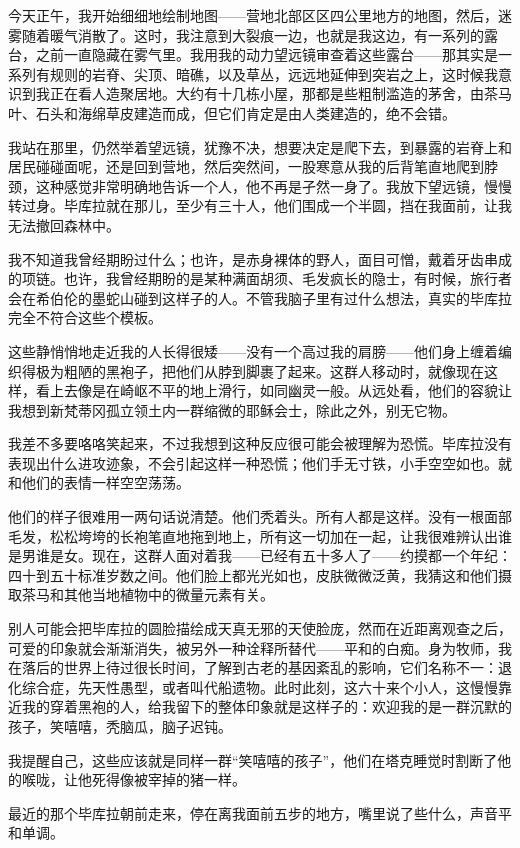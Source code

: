 \documentclass[AutoFakeBold=true]{book}
\begin{document}
今天正午，我开始细细地绘制地图——营地北部区区四公里地方的地图，然后，迷雾随着暖气消散了。这时，我注意到大裂痕一边，也就是我这边，有一系列的露台，之前一直隐藏在雾气里。我用我的动力望远镜审查着这些露台——那其实是一系列有规则的岩脊、尖顶、暗礁，以及草丛，远远地延伸到突岩之上，这时候我意识到我正在看人造聚居地。大约有十几栋小屋，那都是些粗制滥造的茅舍，由茶马叶、石头和海绵草皮建造而成，但它们肯定是由人类建造的，绝不会错。

我站在那里，仍然举着望远镜，犹豫不决，想要决定是爬下去，到暴露的岩脊上和居民碰碰面呢，还是回到营地，然后突然间，一股寒意从我的后背笔直地爬到脖颈，这种感觉非常明确地告诉一个人，他不再是孑然一身了。我放下望远镜，慢慢转过身。毕库拉就在那儿，至少有三十人，他们围成一个半圆，挡在我面前，让我无法撤回森林中。

我不知道我曾经期盼过什么；也许，是赤身裸体的野人，面目可憎，戴着牙齿串成的项链。也许，我曾经期盼的是某种满面胡须、毛发疯长的隐士，有时候，旅行者会在希伯伦的墨蛇山碰到这样子的人。不管我脑子里有过什么想法，真实的毕库拉完全不符合这些个模板。

这些静悄悄地走近我的人长得很矮——没有一个高过我的肩膀——他们身上缠着编织得极为粗陋的黑袍子，把他们从脖到脚裹了起来。这群人移动时，就像现在这样，看上去像是在崎岖不平的地上滑行，如同幽灵一般。从远处看，他们的容貌让我想到新梵蒂冈孤立领土内一群缩微的耶稣会士，除此之外，别无它物。

我差不多要咯咯笑起来，不过我想到这种反应很可能会被理解为恐慌。毕库拉没有表现出什么进攻迹象，不会引起这样一种恐慌；他们手无寸铁，小手空空如也。就和他们的表情一样空空荡荡。

他们的样子很难用一两句话说清楚。他们秃着头。所有人都是这样。没有一根面部毛发，松松垮垮的长袍笔直地拖到地上，所有这一切加在一起，让我很难辨认出谁是男谁是女。现在，这群人面对着我——已经有五十多人了——约摸都一个年纪：四十到五十标准岁数之间。他们脸上都光光如也，皮肤微微泛黄，我猜这和他们摄取茶马和其他当地植物中的微量元素有关。

别人可能会把毕库拉的圆脸描绘成天真无邪的天使脸庞，然而在近距离观查之后，可爱的印象就会渐渐消失，被另外一种诠释所替代——平和的白痴。身为牧师，我在落后的世界上待过很长时间，了解到古老的基因紊乱的影响，它们名称不一：退化综合症，先天性愚型，或者叫代船遗物。此时此刻，这六十来个小人，这慢慢靠近我的穿着黑袍的人，给我留下的整体印象就是这样子的：欢迎我的是一群沉默的孩子，笑嘻嘻，秃脑瓜，脑子迟钝。

我提醒自己，这些应该就是同样一群``笑嘻嘻的孩子''，他们在塔克睡觉时割断了他的喉咙，让他死得像被宰掉的猪一样。

最近的那个毕库拉朝前走来，停在离我面前五步的地方，嘴里说了些什么，声音平和单调。
\end{document}
